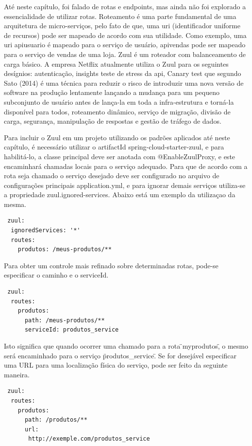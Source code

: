\documentclass[journal]{IEEEtran}
\begin{document}
Até neste capítulo, foi falado de rotas e endpoints, mas ainda não foi explorado a essencialidade de utilizar rotas. Roteamento é uma parte fundamental de uma arquitetura de micro-serviços, pelo fato de que, uma uri (identificador uniforme de recursos) pode ser mapeado de acordo com sua utilidade. Como exemplo, uma uri \/api\/usuario é mapeado para o serviço de usuário, \/api\/vendas pode ser mapeado para o serviço de vendas de uma loja. Zuul é um roteador com balanceamento de carga básico. A empresa Netflix atualmente utiliza o Zuul para os seguintes desígnios: autenticação, insights teste de stress da api, Canary test que segundo Sato (2014) é uma técnica para reduzir o risco de introduzir uma nova versão de software na produção lentamente lançando a mudança para um pequeno subconjunto de usuário antes de lança-la em toda a infra-estrutura e torná-la disponível para todos, roteamento dinâmico, serviço de migração, divisão de carga, segurança, manipulação de respostas e gestão de tráfego de dados.

Para incluir o Zuul em um projeto utilizando os padrões aplicados até neste capítulo, é necessário utilizar o artifactId spring-cloud-starter-zuul, e para habilitá-lo, a classe principal deve ser anotada com @EnableZuulProxy, e este encaminhará chamadas locais para o serviço adequado. Para que de acordo com a rota seja chamado o serviço desejado deve ser configurado no arquivo de configurações principais application.yml, e para ignorar demais serviços utiliza-se a propriedade zuul.ignored-services. Abaixo está um exemplo da utilizaçao da mesma.

\begin{verbatim}
 zuul:
  ignoredServices: '*'
  routes:
    produtos: /meus-produtos/**
\end{verbatim}

Para obter um controle mais refinado sobre determinadas rotas, pode-se especificar o caminho e o serviceId.

\begin{verbatim}
 zuul:
  routes:
    produtos:
      path: /meus-produtos/**
      serviceId: produtos_service
\end{verbatim}

Isto significa que quando ocorrer uma chamado para a rota \"\/myprodutos\", o mesmo será encaminhado para o serviço \"produtos\_service\". Se for desejável especificar uma URL para uma localização física do serviço, pode ser feito da seguinte maneira.

\begin{verbatim}
 zuul:
  routes:
    produtos:
      path: /produtos/**
      url: 
       http://exemple.com/produtos_service
\end{verbatim}
\end{document}
